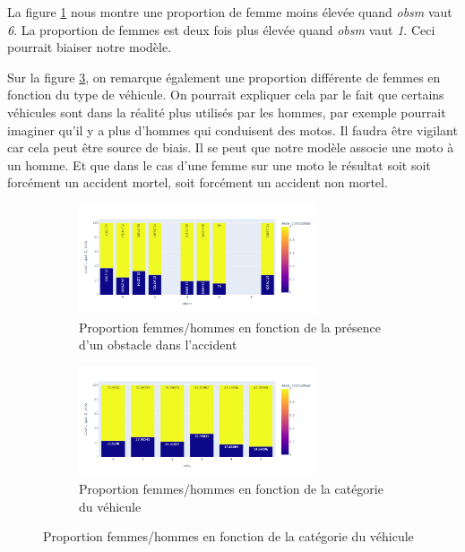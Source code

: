 \documentclass{article}
\begin{document}
    La figure \ref{fig:fig_sexe_bivar1} nous montre une proportion de femme moins élevée quand \textit{obsm} vaut 
    \textit{6}. La proportion de femmes est deux fois plus élevée quand \textit{obsm} vaut \textit{1}. Ceci pourrait biaiser notre 
    modèle.
    
    Sur la figure \ref{fig:fig_sexe_bivar2}, on remarque également une proportion différente de femmes 
    en fonction du type de véhicule. On pourrait expliquer cela par le fait que certains véhicules sont 
    dans la réalité plus utilisés par les hommes, par exemple pourrait imaginer qu'il y a plus d'hommes qui 
    conduisent des motos. Il faudra être vigilant car cela peut être source de biais. Il se peut que notre 
    modèle associe une moto à un homme. Et que dans le cas d'une femme sur une moto le résultat soit soit 
    forcément un accident mortel, soit forcément un accident non mortel.

    \begin{figure}[h]
        \centering
        \begin{subfigure}{7cm}
            \includegraphics[width=7cm]{./img/bivar_sexe.png}
            \caption{Proportion femmes/hommes en fonction de la présence d'un obstacle dans l'accident}
            \label{fig:fig_sexe_bivar1}
        \end{subfigure}
        \hspace{0.2cm}
        \begin{subfigure}{7cm}
            \includegraphics[width=7cm]{./img/bivar_sexe2.png}
        \caption{Proportion femmes/hommes en fonction de la catégorie du véhicule}
        \label{fig:fig_sexe_bivar2}
        \end{subfigure}
    \end{figure}
    \vspace{2cm}
\end{document}
